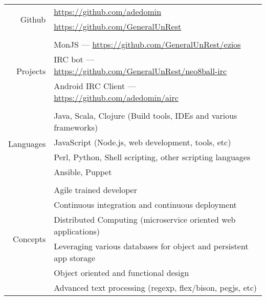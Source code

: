 \documentclass[9pt,letterpaper,]{article}
\begin{document}
\begin{center}
\begin{longtable}{r|l}
    \multirow{2}{*}{Github} & \href{https://github.com/adedomin}{https://github.com/adedomin} \\
                            & \href{https://github.com/GeneralUnRest}{https://github.com/GeneralUnRest} \\
    \\
    \multirow{3}{*}{Projects} & MonJS --- \href{https://github.com/GeneralUnRest/ezios}{https://github.com/GeneralUnRest/ezios} \\
                              & IRC bot --- \href{https://github.com/GeneralUnRest/neo8ball-irc}{https://github.com/GeneralUnRest/neo8ball-irc} \\

                              & Android IRC Client --- \href{https://github.com/adedomin/airc}{https://github.com/adedomin/airc} \\
    \\
    \multirow{4}{*}{Languages} & Java, Scala, Clojure (Build tools, IDEs and various frameworks) \\
                               & JavaScript (Node.js, web development, tools, etc) \\
                               & Perl, Python, Shell scripting, other scripting languages \\
                               & Ansible, Puppet \\
    \\
    \multirow{6}{*}{Concepts} & Agile trained developer \\
                              & Continuous integration and continuous deployment \\
                              & Distributed Computing (microservice oriented web applications) \\
                              & Leveraging various databases for object and persistent app storage \\
                              & Object oriented and functional design \\
                              & Advanced text processing (regexp, flex/bison, pegjs, etc) \\
\end{longtable}
\end{center}
\end{document}
